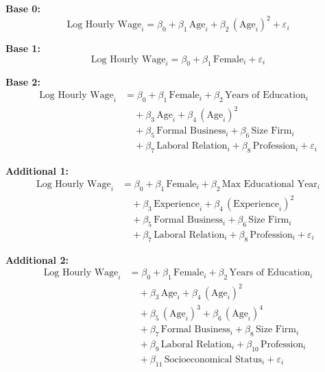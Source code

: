 \documentclass[12pt,a4paper,onecolumn]{article}
\begin{document}
\begin{description}[style=nextline, leftmargin=0pt, labelwidth=0pt, labelsep=0pt, itemsep=2pt, topsep=2pt]

\item \textbf{Base 0:}
\[
\text{Log Hourly Wage}_i
  = \beta_0 + \beta_1\,\text{Age}_i + \beta_2\,(\text{Age}_i)^{2} + \varepsilon_i
\]

\item \textbf{Base 1:}
\[
\text{Log Hourly Wage}_i
  = \beta_0 + \beta_1\,\text{Female}_i + \varepsilon_i
\]

\item \textbf{Base 2:}
\[
\begin{aligned}
\text{Log Hourly Wage}_i
  &= \beta_0 + \beta_1\,\text{Female}_i + \beta_2\,\text{Years of Education}_i \\
  &\quad + \beta_3\,\text{Age}_i + \beta_4\,(\text{Age}_i)^{2} \\
  &\quad + \beta_5\,\text{Formal Business}_i + \beta_6\,\text{Size Firm}_i \\
  &\quad + \beta_7\,\text{Laboral Relation}_i + \beta_8\,\text{Profession}_i + \varepsilon_i
\end{aligned}
\]

\item \textbf{Additional 1:}
\[
\begin{aligned}
\text{Log Hourly Wage}_i
  &= \beta_0 + \beta_1\,\text{Female}_i + \beta_2\,\text{Max Educational Year}_i \\
  &\quad + \beta_3\,\text{Experience}_i + \beta_4\,(\text{Experience}_i)^{2} \\
  &\quad + \beta_5\,\text{Formal Business}_i + \beta_6\,\text{Size Firm}_i \\
  &\quad + \beta_7\,\text{Laboral Relation}_i + \beta_8\,\text{Profession}_i + \varepsilon_i
\end{aligned}
\]

\item \textbf{Additional 2:}
\[
\begin{aligned}
\text{Log Hourly Wage}_i
  &= \beta_0 + \beta_1\,\text{Female}_i + \beta_2\,\text{Years of Education}_i \\
  &\quad + \beta_3\,\text{Age}_i + \beta_4\,(\text{Age}_i)^{2} \\
  &\quad + \beta_5\,(\text{Age}_i)^{3} + \beta_6\,(\text{Age}_i)^{4} \\
  &\quad + \beta_7\,\text{Formal Business}_i + \beta_8\,\text{Size Firm}_i \\
  &\quad + \beta_9\,\text{Laboral Relation}_i + \beta_{10}\,\text{Profession}_i \\
  &\quad + \beta_{11}\,\text{Socioeconomical Status}_i + \varepsilon_i
\end{aligned}
\]


\end{description}
\end{document}
